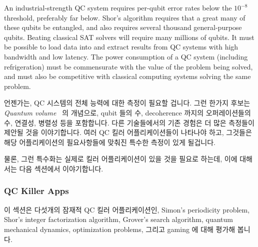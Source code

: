An industrial-strength QC system requires per-qubit error rates below the
$10^{-8}$ threshold, preferably far below.
Shor's algorithm requires that a great many of these qubits be entangled,
and also requires several thousand general-purpose qubits.
Beating classical SAT solvers will require many millions of qubits.
It must be possible to load data into and extract results from QC
systems with high bandwidth and low latency.
The power consumption of a QC system (including refrigeration) must be
commensurate with the value of the problem being solved, and must also
be competitive with classical computing systems solving the same problem.
\fi

언젠가는, QC 시스템의 전체 능력에 대한 측정이 필요할 겁니다.
그런 한가지 후보는 \emph{Quantum volume}~\cite{LevSBishop2017QuantumVolume} 의
개념으로, qubit 들의 수, decoherence 까지의 오퍼레이션들의 수, 연결성, 병렬성
등을 포함합니다.
다른 기술들에서의 기존 경험은 더 많은 측정들이 제안될 것을 이야기합니다.
여러 QC 킬러 어플리케이션들이 나타나야 하고, 그것들은 해당 어플리케이션의
필요사항들에 맞춰진 특수한 측정이 있게 될겁니다.

물론, 그런 특수화는 실제로 킬러 어플리케이션이 있을 것을 필요로 하는데, 이에
대해서는 다음 섹션에서 이야기합니다.

\subsubsection{QC Killer Apps}
\label{sec:future:QC Killer Apps}

이 섹션은 다섯개의 잠재적 QC 킬러 어플리케이션인,
Simon's periodicity problem,
Shor's integer factorization algorithm,
Grover's search algorithm,
quantum mechanical dynamics,
optimization problems, 그리고
gaming 에 대해 평가해 봅니다.
\iffalse

